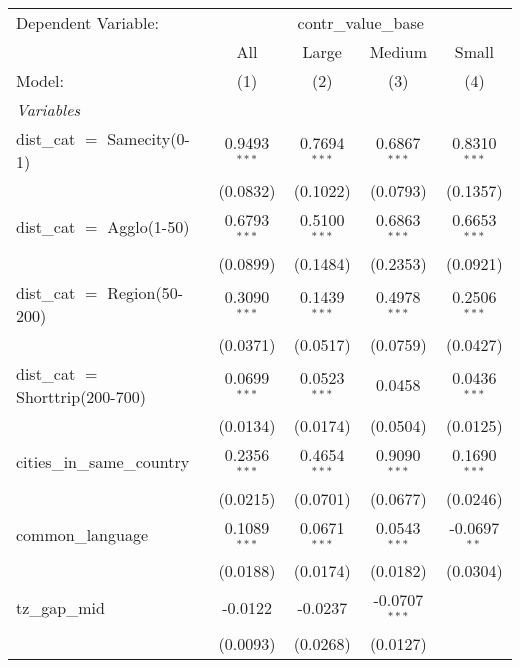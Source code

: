 
\begingroup
\centering
\begin{tabular}{lcccc}
   \tabularnewline \midrule \midrule
   Dependent Variable: & \multicolumn{4}{c}{contr\_value\_base}\\
                                     & All             & Large          & Medium          & Small \\   
   Model:                            & (1)             & (2)            & (3)             & (4)\\  
   \midrule
   \emph{Variables}\\
   dist\_cat $=$ Samecity(0-1)       & 0.9493$^{***}$  & 0.7694$^{***}$ & 0.6867$^{***}$  & 0.8310$^{***}$\\   
                                     & (0.0832)        & (0.1022)       & (0.0793)        & (0.1357)\\   
   dist\_cat $=$ Agglo(1-50)         & 0.6793$^{***}$  & 0.5100$^{***}$ & 0.6863$^{***}$  & 0.6653$^{***}$\\   
                                     & (0.0899)        & (0.1484)       & (0.2353)        & (0.0921)\\   
   dist\_cat $=$ Region(50-200)      & 0.3090$^{***}$  & 0.1439$^{***}$ & 0.4978$^{***}$  & 0.2506$^{***}$\\   
                                     & (0.0371)        & (0.0517)       & (0.0759)        & (0.0427)\\   
   dist\_cat $=$ Shorttrip(200-700)  & 0.0699$^{***}$  & 0.0523$^{***}$ & 0.0458          & 0.0436$^{***}$\\   
                                     & (0.0134)        & (0.0174)       & (0.0504)        & (0.0125)\\   
   cities\_in\_same\_country         & 0.2356$^{***}$  & 0.4654$^{***}$ & 0.9090$^{***}$  & 0.1690$^{***}$\\   
                                     & (0.0215)        & (0.0701)       & (0.0677)        & (0.0246)\\   
   common\_language                  & 0.1089$^{***}$  & 0.0671$^{***}$ & 0.0543$^{***}$  & -0.0697$^{**}$\\   
                                     & (0.0188)        & (0.0174)       & (0.0182)        & (0.0304)\\   
   tz\_gap\_mid                      & -0.0122         & -0.0237        & -0.0707$^{***}$ &   \\   
                                     & (0.0093)        & (0.0268)       & (0.0127)        &   \\   

\end{tabular}
